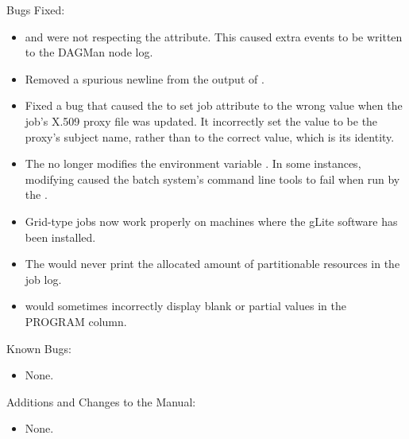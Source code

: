 \noindent Bugs Fixed:

\begin{itemize}

\item {} and  were not respecting the
 attribute. This caused extra events to be written to
the DAGMan node log.

\item Removed a spurious newline from the output of .

\item Fixed a bug that caused the  to set job attribute
 to the wrong value when the job's X.509
proxy file was updated. It incorrectly set the value to be 
the proxy's subject name, rather than to the correct value, which is
its identity.

\item The  no longer modifies the environment variable
.
In some instances, modifying  caused the
batch system's command line tools to fail when run by the .

\item Grid-type  jobs now work properly on machines
where the gLite software has been installed.

\item The  would never print the allocated amount of
partitionable resources in the job log.

\item {} would sometimes incorrectly display blank or partial
values in the PROGRAM column.

\end{itemize}

\noindent Known Bugs:

\begin{itemize}

\item None.

\end{itemize}

\noindent Additions and Changes to the Manual:

\begin{itemize}

\item None.

\end{itemize}


